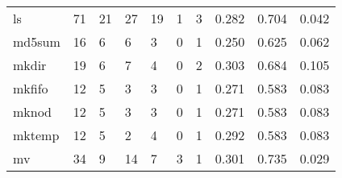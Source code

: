 \begin{longtable}{lp{2.0cm}p{2.0cm}p{2.0cm}p{2.0cm}p{2.0cm}p{2.0cm}p{2.0cm}p{2.0cm}p{2.0cm}}
ls        &                     71 &                                            21 &                                           27 &                                          19 &                                            1 &                                          3 &                                0.282 &                                  0.704 &                                0.042 \\
md5sum    &                     16 &                                             6 &                                            6 &                                           3 &                                            0 &                                          1 &                                0.250 &                                  0.625 &                                0.062 \\
mkdir     &                     19 &                                             6 &                                            7 &                                           4 &                                            0 &                                          2 &                                0.303 &                                  0.684 &                                0.105 \\
mkfifo    &                     12 &                                             5 &                                            3 &                                           3 &                                            0 &                                          1 &                                0.271 &                                  0.583 &                                0.083 \\
mknod     &                     12 &                                             5 &                                            3 &                                           3 &                                            0 &                                          1 &                                0.271 &                                  0.583 &                                0.083 \\
mktemp    &                     12 &                                             5 &                                            2 &                                           4 &                                            0 &                                          1 &                                0.292 &                                  0.583 &                                0.083 \\
mv        &                     34 &                                             9 &                                           14 &                                           7 &                                            3 &                                          1 &                                0.301 &                                  0.735 &                                0.029 \\

\end{longtable}
